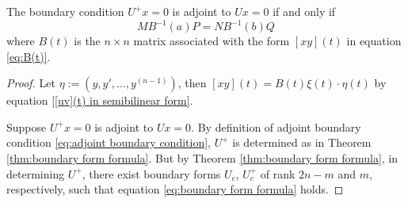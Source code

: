 \documentclass[12pt, oneside, a4paper]{article}
\begin{document}
\begin{thm}\cite[p.289]{CoddingtonLevinson}\label{thm:condition iff adjoint}
    The boundary condition $U^+x=0$ is adjoint to $Ux=0$ if and only if
    \begin{equation}\label{eq:condition iff adjoint}
        MB^{-1}(a)P = NB^{-1}(b)Q
    \end{equation}
    where $B(t)$ is the $n\times n$ matrix associated with the form $[xy](t)$ in equation \eqref{eq:B(t)}.
\end{thm}
\begin{proof}
    Let $\eta := (y, y', \ldots, y^{(n-1)})$,
    then $[xy](t)=B(t)\xi(t)\cdot \eta(t)$ by equation \eqref{[uv](t) in semibilinear form}.

    Suppose $U^+x=0$ is adjoint to $Ux=0$. By definition of adjoint boundary condition \eqref{eq:adjoint boundary condition}, $U^+$ is determined as in Theorem \ref{thm:boundary form formula}. But by Theorem \ref{thm:boundary form formula}, in determining $U^+$, there exist boundary forms $U_c$, $U_c^+$ of rank $2n-m$ and $m$, respectively, such that equation \eqref{eq:boundary form formula} holds. 


\end{proof}
\end{document}
